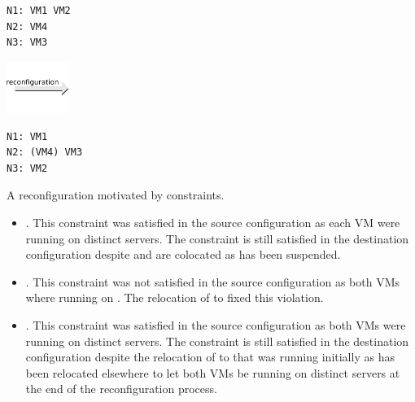 \begin{reconfiguration}
\centering
\begin{minipage}[b]{0.40\textwidth}
\begin{lstlisting}
N1: VM1 VM2
N2: VM4
N3: VM3
\end{lstlisting}
\end{minipage}
\begin{minipage}[b]{2cm}
\includegraphics[width=2cm]{img/arrow_reconfiguration}
\end{minipage}
\begin{minipage}[b]{0.40\textwidth}
\begin{lstlisting}
N1: VM1
N2: (VM4) VM3
N3: VM2
\end{lstlisting}
\end{minipage}
\caption{A reconfiguration motivated by  constraints.}\label{fig: lazySpread}
\end{reconfiguration}

\begin{itemize}

\item {}. This constraint was satisfied in the sour\-ce configuration as each VM were running on distinct servers. The constraint is still satisfied in the destination configuration despite  and  are colocated as  has been suspended.

\item {}. This constraint was not satisfied in the source configuration as both VMs where running on . The relocation of  to  fixed this violation.

\item {}. This constraint was satisfied in the source configuration as both VMs were running on distinct servers. The constraint is still satisfied in the destination configuration despite the relocation of  to  that was running  initially as  has been relocated elsewhere to let both VMs be running on distinct servers at the end of the reconfiguration process.
\end{itemize}


